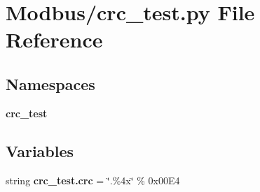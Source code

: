 \section{Modbus/crc\+\_\+test.py File Reference}
\label{crc__test_8py}
\subsection*{Namespaces}
\begin{DoxyCompactItemize}
\item 
 \textbf{ crc\+\_\+test}
\end{DoxyCompactItemize}
\subsection*{Variables}
\begin{DoxyCompactItemize}
\item 
string \textbf{ crc\+\_\+test.\+crc} = \char`\"{}.\%4x\char`\"{} \% 0x00\+E4
\end{DoxyCompactItemize}
